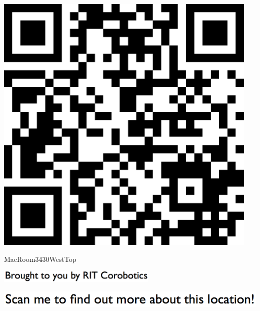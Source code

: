 \documentclass[letterpaper]{article}
\begin{document}
 \begingroup 
 \centerline{\includegraphics[scale=1,width=5in,height=5in]{MacRoom3430WestTop.png}} 
 \endgroup 
 \vspace*{\fill} 

 \hfill{\small MacRoom3430WestTop} 

  \vspace{0.7in} 
 
 \centerline{\includegraphics[scale=1,width=3in]{text-bottom.png}} 
 
 \pagebreak 
{} 
 \vspace*{\fill} 
 
  \centerline{\includegraphics[scale=1,width=6in]{text-top.png}} 
 
 \vspace{0.5in} 
 
\end{document}
